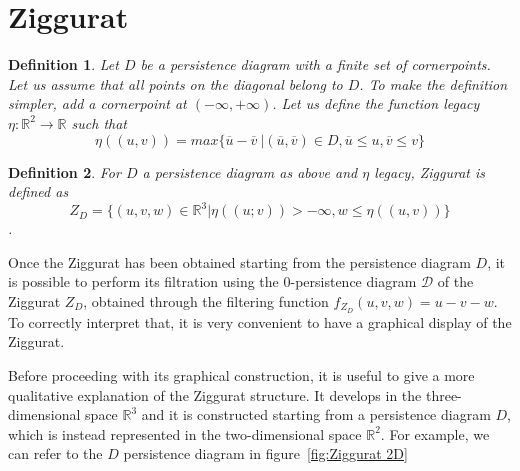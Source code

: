 \documentclass[english, LaM, oneside, noexaminfo]{sapthesis}
\newtheorem{defin}{\bf Definition}[section]
\begin{document}
\section{Ziggurat}

\begin{defin} Let $D$ be a persistence diagram with a finite set of cornerpoints. Let us assume that all points on the diagonal belong to $D$. To make
the definition simpler, add a cornerpoint at $(-\infty, +\infty)$. 
Let us define the function \textit{legacy} $\eta: \mathbb{R}^2 \rightarrow \mathbb{R}$ such that $$\eta((u, v)) = max\{\overline{u} - \overline{v} \ | (\overline{u}, \overline{v}) \in D, \overline{u} \leq u, \overline{v} \leq v\}$$\end{defin}

\begin{defin} For $D$ a persistence diagram as above and $\eta$ legacy, \textit{Ziggurat} is defined as $$Z_D = \{(u, v, w) \in \mathbb{R}^3 | \eta((u; v)) > -\infty, w \leq \eta((u,v))\}$$.   \end{defin}

\noindent Once the Ziggurat has been obtained starting from the persistence diagram $D$, it is possible to perform its filtration using the $0$-persistence diagram $\mathcal{D}$ of the Ziggurat $Z_D$, obtained through the filtering function $f_{Z_D}(u, v, w) = u - v - w$.
To correctly interpret that, it is very convenient to
have a graphical display of the Ziggurat.

Before proceeding with its graphical construction, it is useful to give a more qualitative explanation of the Ziggurat structure. It develops in the three-dimensional space $\mathbb{R}^3$ and it is constructed starting from a persistence diagram $D$, which is instead represented in the two-dimensional space $\mathbb{R}^2$.
For example, we can refer to the $D$ persistence diagram in figure~\ref{fig:Ziggurat 2D}
\end{document}
